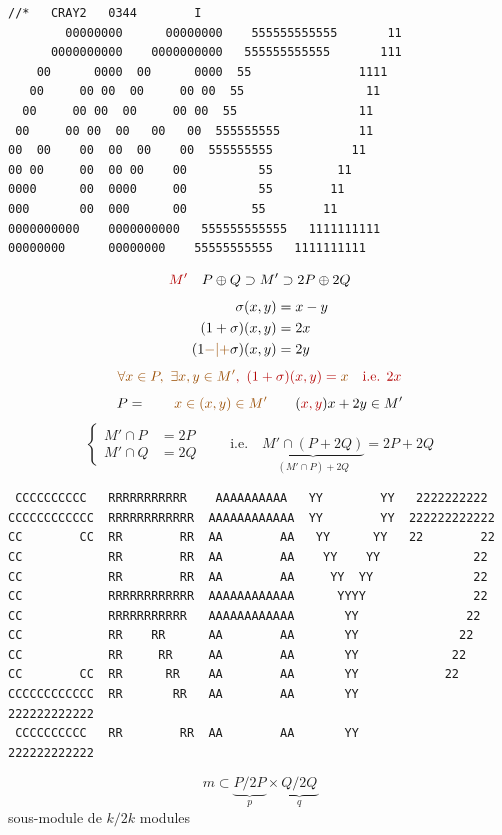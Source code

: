 \begin{verbatim}
//*   CRAY2   0344        I
        00000000      00000000    555555555555       11
      0000000000    0000000000   555555555555       111
    00      0000  00      0000  55               1111
   00     00 00  00     00 00  55                 11
  00     00 00  00     00 00  55                 11
 00     00 00  00   00   00  555555555           11
00  00    00  00  00    00  555555555           11
00 00     00  00 00    00          55         11
0000      00  0000     00          55        11
000       00  000      00         55        11
0000000000    0000000000   555555555555   1111111111
00000000      00000000    55555555555   1111111111
\end{verbatim}
\[
\deleted{M'}\quad P\oplus Q\supset M'\supset2P\oplus2Q
\]
\[
\begin{aligned}
\sigma(x,y)&=x-y\\
(1+\sigma)(x,y)&=2x\\
(1\unsure{-|+}\sigma)(x,y)&=2y
\end{aligned}
\]
\[
\deleted{\unsure{\forall x\in P,\ \exists x,y\in M'},\ (1+\sigma)(x,y)=\unsure{x}\quad\text{i.e. }2x}
\]
\[
P=\qquad\deleted{\unsure{x\in(x,y)\in M'}}\qquad
(\deleted{x,y})x+2y\in M'
\]
\[
\left\{\begin{aligned}M'\cap P&=2P\\M'\cap Q&=2Q\end{aligned}\right.
\qquad\text{i.e.}\quad
\underbrace{M'\cap(P+2Q)}_{(M'\cap P)+2Q}=2P+2Q
\]
\begin{verbatim}
 CCCCCCCCCC   RRRRRRRRRRR    AAAAAAAAAA   YY        YY   2222222222
CCCCCCCCCCCC  RRRRRRRRRRRR  AAAAAAAAAAAA  YY        YY  222222222222
CC        CC  RR        RR  AA        AA   YY      YY   22        22
CC            RR        RR  AA        AA    YY    YY             22
CC            RR        RR  AA        AA     YY  YY              22
CC            RRRRRRRRRRRR  AAAAAAAAAAAA      YYYY               22
CC            RRRRRRRRRRR   AAAAAAAAAAAA       YY               22
CC            RR    RR      AA        AA       YY              22
CC            RR     RR     AA        AA       YY             22
CC        CC  RR      RR    AA        AA       YY            22
CCCCCCCCCCCC  RR       RR   AA        AA       YY           222222222222
 CCCCCCCCCC   RR        RR  AA        AA       YY           222222222222
\end{verbatim}
\[
m\subset\underbrace{P/2P}_p\times\underbrace{Q/2Q}_q
\]
sous-module de $k/2k$ modules
